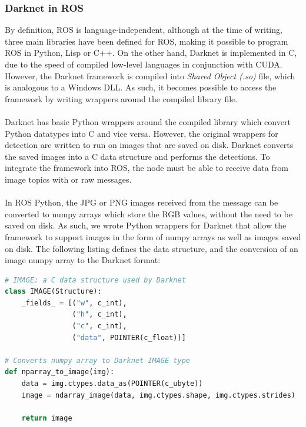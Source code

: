 \subsubsection{Darknet in ROS}
By definition, ROS is language-independent, although at the time of writing, three main libraries have been defined for ROS, making it possible to program ROS in Python, Lisp or C++. On the other hand, Darknet is implemented in C, due to the speed of compiled low-level languages in conjunction with CUDA. However, the Darknet framework is compiled into \textit{Shared Object (.so)} file, which is analogous to a Windows DLL. As such, it becomes possible to access the framework by writing wrappers around the compiled library file.

\paragraph{}Darknet has basic Python wrappers around the compiled library which convert Python datatypes into C and vice versa. However, the original wrappers for detection are written to run on images that are saved on disk. Darknet converts the saved images into a C data structure  and performs the detections. To integrate the framework into ROS, the node must be able to receive data from image topics with  or raw  messages.

\paragraph{}In ROS Python, the JPG or PNG images received from the  message can be converted to numpy arrays which store the RGB values, without the need to be saved on disk. As such, we wrote Python wrappers for Darknet that allow the framework to support images in the form of numpy arrays as well as images saved on disk. The following listing defines the  data structure, and the conversion of an image numpy array to the Darknet format: \\



\begin{lstlisting}[language=Python, caption={Darknet IMAGE Python wrappers}]
# IMAGE: a C data structure used by Darknet
class IMAGE(Structure): 
	_fields_ = [("w", c_int),
				("h", c_int),
				("c", c_int),
				("data", POINTER(c_float))]
				
# Converts numpy array to Darknet IMAGE type
def nparray_to_image(img): 
	data = img.ctypes.data_as(POINTER(c_ubyte))
	image = ndarray_image(data, img.ctypes.shape, img.ctypes.strides)

	return image
\end{lstlisting}

